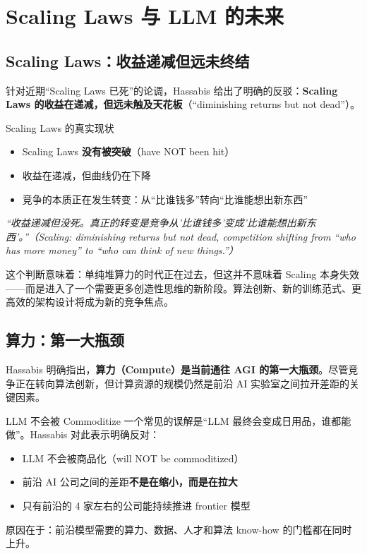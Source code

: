 \section{Scaling Laws 与 LLM 的未来}

\subsection{Scaling Laws：收益递减但远未终结}

针对近期``Scaling Laws 已死''的论调，Hassabis 给出了明确的反驳：\textbf{Scaling Laws 的收益在递减，但远未触及天花板}（``diminishing returns but not dead''）。

\begin{importantbox}{Scaling Laws 的真实现状}
\begin{itemize}
    \item Scaling Laws \textbf{没有被突破}（have NOT been hit）
    \item 收益在递减，但曲线仍在下降
    \item 竞争的本质正在发生转变：从``比谁钱多''转向``比谁能想出新东西''
\end{itemize}
\textit{``收益递减但没死。真正的转变是竞争从'比谁钱多'变成'比谁能想出新东西'。''（Scaling: diminishing returns but not dead, competition shifting from ``who has more money'' to ``who can think of new things.''）}
\end{importantbox}

这个判断意味着：单纯堆算力的时代正在过去，但这并不意味着 Scaling 本身失效——而是进入了一个需要更多创造性思维的新阶段。算法创新、新的训练范式、更高效的架构设计将成为新的竞争焦点。

\subsection{算力：第一大瓶颈}

Hassabis 明确指出，\textbf{算力（Compute）是当前通往 AGI 的第一大瓶颈}。尽管竞争正在转向算法创新，但计算资源的规模仍然是前沿 AI 实验室之间拉开差距的关键因素。

\begin{warningbox}{LLM 不会被 Commoditize}
一个常见的误解是``LLM 最终会变成日用品，谁都能做''。Hassabis 对此表示明确反对：
\begin{itemize}
    \item LLM 不会被商品化（will NOT be commoditized）
    \item 前沿 AI 公司之间的差距\textbf{不是在缩小，而是在拉大}
    \item 只有前沿的 4 家左右的公司能持续推进 frontier 模型
\end{itemize}
原因在于：前沿模型需要的算力、数据、人才和算法 know-how 的门槛都在同时上升。
\end{warningbox}

